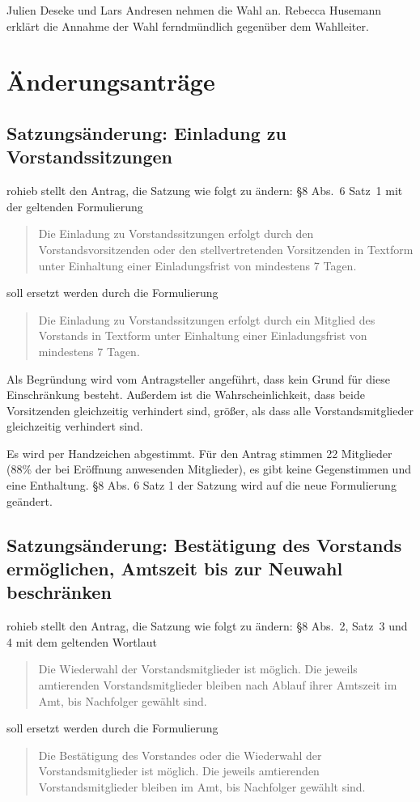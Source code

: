 \documentclass[a4paper,12pt]{scrartcl}
\begin{document}
Julien Deseke und Lars Andresen nehmen die Wahl an. Rebecca Husemann erklärt die
Annahme der Wahl ferndmündlich gegenüber dem Wahlleiter.

\section{Änderungsanträge}

\subsection{Satzungsänderung: Einladung zu Vorstandssitzungen}

rohieb stellt den Antrag, die Satzung wie folgt zu ändern: §8 Abs.~6 Satz~1 mit
der geltenden Formulierung
\begin{quote}
  Die Einladung zu Vorstandssitzungen erfolgt durch den Vorstandsvorsitzenden
  oder den stellvertretenden Vorsitzenden in Textform unter Einhaltung einer
  Einladungsfrist von mindestens 7 Tagen.
\end{quote}
soll ersetzt werden durch die Formulierung
\begin{quote}
  Die Einladung zu Vorstandssitzungen erfolgt durch ein Mitglied des Vorstands
  in Textform unter Einhaltung einer Einladungsfrist von mindestens 7 Tagen.
\end{quote}

Als Begründung wird vom Antragsteller angeführt, dass kein Grund für diese
Einschränkung besteht. Außerdem ist die Wahrscheinlichkeit, dass beide
Vorsitzenden gleichzeitig verhindert sind, größer, als dass alle
Vorstandsmitglieder gleichzeitig verhindert sind.

Es wird per Handzeichen abgestimmt. Für den Antrag stimmen 22 Mitglieder (88\%
der bei Eröffnung anwesenden Mitglieder), es gibt keine Gegenstimmen und eine
Enthaltung. §8 Abs. 6 Satz 1 der Satzung wird auf die neue Formulierung
geändert.

\subsection{Satzungsänderung: Bestätigung des Vorstands ermöglichen, Amtszeit
bis zur Neuwahl beschränken}

rohieb stellt den Antrag, die Satzung wie folgt zu ändern: §8 Abs.~2, Satz~3 und
4 mit dem geltenden Wortlaut
\begin{quote}
  Die Wiederwahl der Vorstandsmitglieder ist möglich. Die jeweils amtierenden
  Vorstandsmitglieder bleiben nach Ablauf ihrer Amtszeit im Amt, bis Nachfolger
  gewählt sind.
\end{quote}
soll ersetzt werden durch die Formulierung
\begin{quote}
  Die Bestätigung des Vorstandes oder die Wiederwahl der Vorstandsmitglieder ist
  möglich. Die jeweils amtierenden Vorstandsmitglieder bleiben im Amt, bis
  Nachfolger gewählt sind.
\end{quote}
\end{document}
